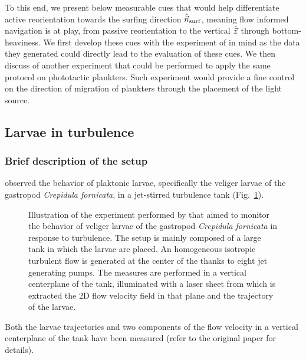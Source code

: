 To this end, we present below measurable cues that would help differentiate active reorientation towards the surfing direction $\hat{\vec{n}}_{\mathrm{surf}}$, meaning flow informed navigation is at play, from passive reorientation to the vertical $\hat{\vec{z}}$ through bottom-heaviness.
We first develop these cues with the experiment of \citet{dibenedetto2022responding} in mind as the data they generated could directly lead to the evaluation of these cues.
We then discuss of another experiment that could be performed to apply the same protocol on phototactic plankters.
Such experiment would provide a fine control on the direction of migration of plankters through the placement of the light source.

\subsection{Larvae in turbulence}

\subsubsection{Brief description of the setup}

\citet{dibenedetto2022responding} observed the behavior of plaktonic larvae, specifically the veliger larvae of the gastropod \textit{Crepidula fornicata}, in a jet-stirred turbulence tank (Fig.~\ref{fig:tank}).
\begin{figure}%
	\centering
	\def\svgwidth{0.9\textwidth}
	
	\caption[Illustration of the experiment performed by \citet{dibenedetto2022responding}.]{
		Illustration of the experiment performed by \citet{dibenedetto2022responding} that aimed to monitor the behavior of veliger larvae of the gastropod \textit{Crepidula fornicata} in response to turbulence.
		The setup is mainly composed of a large tank in which the larvae are placed. 
		An homogeneous isotropic turbulent flow is generated at the center of the thanks to eight jet generating pumps.
		The measures are performed in a vertical centerplane of the tank, illuminated with a laser sheet from which is extracted the 2D flow velocity field in that plane and the trajectory of the larvae.
	}
	\label{fig:tank}
\end{figure}
Both the larvae trajectories and two components of the flow velocity in a vertical centerplane of the tank have been measured (refer to the original paper for details).


